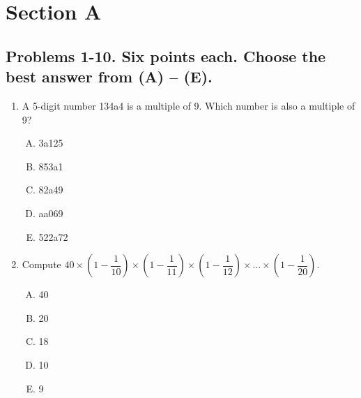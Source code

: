 \documentclass[12pt]{scrartcl}
\begin{document}
\pagestyle{plain}
\newpage
\section{Section A}
\subsection*{Problems 1-10. Six points each. Choose the best answer from (A) -- (E).}
\hrulefill
\begin{enumerate}
    \item A 5-digit number 134a4 is a multiple of 9. Which number is also a multiple of 9?
    \begin{multicols}{5}
        \begin{enumerate}[(A)]
            \item 3a125
            \item 853a1
            \item 82a49
            \item aa069
            \item 522a72
        \end{enumerate}
    \end{multicols} \hrulefill

    \item Compute $40 \times \left(1-\dfrac{1}{10}\right)\times \left(1-\dfrac{1}{11}\right)\times \left(1-\dfrac{1}{12}\right) \times \dots \times \left(1-\dfrac{1}{20}\right)$.
    \begin{multicols}{5}
        \begin{enumerate}[(A)]
            \item 40
            \item 20
            \item 18
            \item 10
            \item 9
        \end{enumerate}
    \end{multicols} \hrulefill


\end{enumerate}
\end{document}
